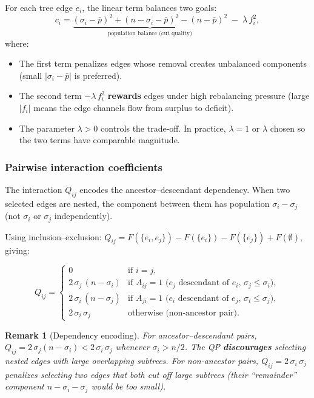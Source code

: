 \documentclass[11pt]{article}
\newcommand{\pbar}{\bar{p}}
\newtheorem{remark}{Remark}
\begin{document}
For each tree edge $e_i$, the linear term balances two goals:
\[
  c_i = \underbrace{(\sigma_i - \pbar)^2 + (n - \sigma_i - \pbar)^2
    - (n - \pbar)^2}_{\text{population balance (cut quality)}}
  \;-\; \lambda\, f_i^2,
\]
where:
\begin{itemize}
  \item The first term penalizes edges whose removal creates unbalanced
    components (small $|\sigma_i - \pbar|$ is preferred).
  \item The second term $-\lambda\, f_i^2$ \textbf{rewards} edges under high
    rebalancing pressure (large $|f_i|$ means the edge channels flow from
    surplus to deficit).
  \item The parameter $\lambda > 0$ controls the trade-off. In practice,
    $\lambda = 1$ or $\lambda$ chosen so the two terms have comparable
    magnitude.
\end{itemize}

\subsubsection*{Pairwise interaction coefficients}

The interaction $Q_{ij}$ encodes the ancestor--descendant dependency. When two
selected edges are nested, the component between them has population
$\sigma_i - \sigma_j$ (not $\sigma_i$ or $\sigma_j$ independently).

Using inclusion--exclusion:
$Q_{ij} = F(\{e_i, e_j\}) - F(\{e_i\}) - F(\{e_j\}) + F(\emptyset)$, giving:

\[
  Q_{ij} =
  \begin{cases}
    0 & \text{if } i = j, \\[4pt]
    2\,\sigma_j\,(n - \sigma_i)
      & \text{if } A_{ij} = 1
        \text{ ($e_j$ descendant of $e_i$, $\sigma_j \leq \sigma_i$)}, \\[4pt]
    2\,\sigma_i\,(n - \sigma_j)
      & \text{if } A_{ji} = 1
        \text{ ($e_i$ descendant of $e_j$, $\sigma_i \leq \sigma_j$)}, \\[4pt]
    2\,\sigma_i\,\sigma_j
      & \text{otherwise (non-ancestor pair).}
  \end{cases}
\]

\begin{remark}[Dependency encoding]
For ancestor--descendant pairs, $Q_{ij} = 2\,\sigma_j(n - \sigma_i) <
2\,\sigma_i\,\sigma_j$ whenever $\sigma_i > n/2$. The QP
\textbf{discourages} selecting nested edges with large overlapping subtrees.
For non-ancestor pairs, $Q_{ij} = 2\,\sigma_i\,\sigma_j$ penalizes selecting
two edges that both cut off large subtrees (their ``remainder'' component
$n - \sigma_i - \sigma_j$ would be too small).
\end{remark}
\end{document}
